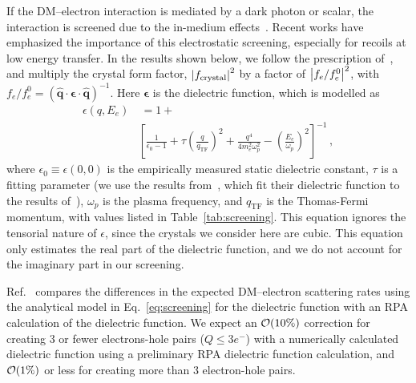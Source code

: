 \documentclass[
    prd, twocolumn, superscriptaddress, nofootinbib, amsmath, amssymb,
    aps, floatfix,preprintnumbers
]{revtex4-2}
\begin{document}
        If the DM--electron interaction is mediated by a dark photon or scalar, the interaction is screened due to the in-medium effects~\cite{Hochberg:2015fth, Gelmini:2020xir}. Recent works \citep{Knapen2021Diel,Hochberg2021Diel} have emphasized the importance of this electrostatic screening, especially for recoils at low energy transfer. In the results shown below, we follow the prescription of~\cite{Griffin21, Trickle2022}, and multiply the crystal form factor, $\abs{f_\mathrm{crystal}}^2$ by a factor of $\abs{f_e/f_e^0}^2$, with $f_e/f_e^0 = \left(\mathbf{\hat{q}\cdot\epsilon\cdot\hat{q}}\right)^{-1}$. Here $\mathbf{\epsilon}$ is the dielectric function, which is modelled as~\cite{screening}
        \begin{equation}\label{eq:screening}
            \begin{split}
                \epsilon (q, E_e)&\ = 1 + \\&\left[\frac{1}{\epsilon_0 - 1} + \tau \left(\frac{q}{q_\mathrm{TF}}\right)^2 + \frac{q^4}{4m_e^2\omega_p^2} - \left(\frac{E_e}{\omega_p}\right)^2\right]^{-1}\,,
            \end{split}
        \end{equation}
        where $\epsilon_0 \equiv \epsilon(0,0)$ is the empirically measured static dielectric constant, $\tau$ is a fitting parameter (we use the results from~\cite{screening}, which fit their dielectric function to the results of~\cite{Walter:1970dielectric}), $\omega_p$ is the plasma frequency, and $q_\mathrm{TF}$ is the Thomas-Fermi momentum, with values listed in Table~\ref{tab:screening}. This equation ignores the tensorial nature of $\epsilon$, since the crystals we consider here are cubic. This equation only estimates the real part of the dielectric function, and we do not account for the imaginary part in our screening. 
        
        Ref.~\cite{Trickle2022} compares the differences in the expected DM--electron scattering rates using the analytical model in Eq.~\eqref{eq:screening} for the dielectric function with an RPA calculation of the dielectric function. We expect an $\order{10\%}$ correction for creating 3 or fewer electrons-hole pairs ($Q \leq 3e^-$) with a numerically calculated dielectric function using a preliminary RPA dielectric function calculation, and $\order{1\%}$ or less for creating more than 3 electron-hole pairs.
\end{document}
